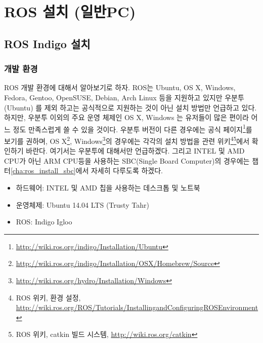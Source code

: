 
\chapter{ROS 설치 (일반PC)}
\label{cha:RosInstall}

\section{ROS Indigo 설치}

\subsection{개발 환경}

ROS 개발 환경에 대해서 알아보기로 하자. ROS는 Ubuntu, OS X, Windows, Fedora, Gentoo, OpenSUSE, Debian, Arch Linux 등을 지원하고 있지만 우분투(Ubuntu) 를 제외 하고는 공식적으로 지원하는 것이 아닌 설치 방법만 언급하고 있다. 하지만, 우분투 이외의 주요 운영 체제인 OS X, Windows 는 유저들이 많은 편이라 어느 정도 만족스럽게 쓸 수 있을 것이다. 우분투 버전이 다른 경우에는 공식 페이지\footnote{\url{http://wiki.ros.org/indigo/Installation/Ubuntu}}를 보기를 권하며, OS X\footnote{\url{http://wiki.ros.org/indigo/Installation/OSX/Homebrew/Source}}, Windows\footnote{\url{http://wiki.ros.org/hydro/Installation/Windows}}의 경우에는 각각의 설치 방법을 관련 위키\footnote{ROS 위키, 환경 설정, \url{http://wiki.ros.org/ROS/Tutorials/InstallingandConfiguringROSEnvironment}}\footnote{ROS 위키, catkin 빌드 시스템, \url{http://wiki.ros.org/catkin}}에서 확인하기 바란다. 여기서는 우분투에 대해서만 언급하겠다. 그리고 INTEL 및 AMD CPU가 아닌 ARM CPU등을 사용하는 SBC(Single Board Computer)의 경우에는 챕터\ref{cha:ros_install_sbc}에서 자세히 다루도록 하겠다.
\\
\begin{itemize}
\item 하드웨어: INTEL 및 AMD 칩을 사용하는 데스크톱 및 노트북 
\item 운영체제: Ubuntu 14.04 LTS (Trusty Tahr)
\item ROS: Indigo Igloo
\end{itemize}

